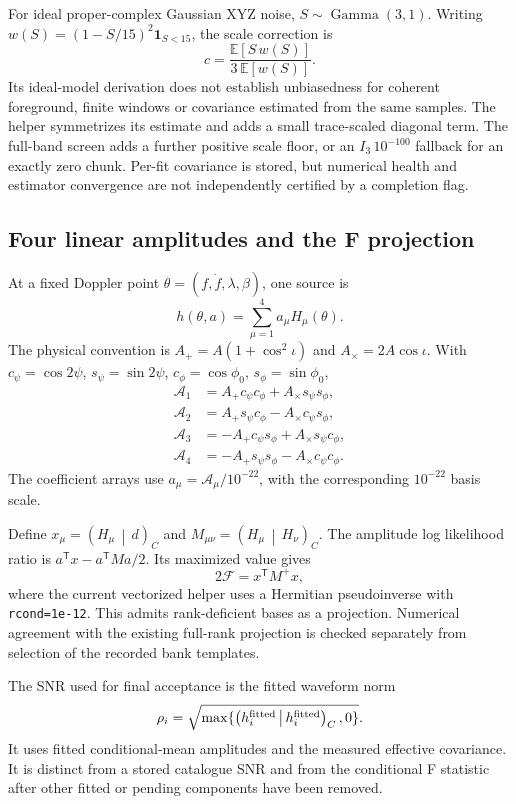 \documentclass[11pt,a4paper]{article}
\newcommand{\code}[1]{\texttt{\nolinkurl{#1}}}
\newcommand{\ip}[2]{\left(#1\,\middle|\,#2\right)}
\begin{document}
For ideal proper-complex Gaussian XYZ noise, \(S\sim\operatorname{Gamma}(3,1)\).
Writing \(w(S)=(1-S/15)^2\mathbf1_{S<15}\), the scale correction is
\[
c=\frac{\mathbb E[S\,w(S)]}{3\,\mathbb E[w(S)]}.
\]
Its ideal-model derivation does not establish unbiasedness for coherent
foreground, finite windows or covariance estimated from the same samples.
The helper symmetrizes its estimate and adds a small trace-scaled diagonal
term. The full-band screen adds a further positive scale floor, or an
\(I_3\,10^{-100}\) fallback for an exactly zero chunk. Per-fit covariance is
stored, but numerical health and estimator convergence are not independently
certified by a completion flag.

\subsection{Four linear amplitudes and the F projection}

At a fixed Doppler point \(\theta=(f,\dot f,\lambda,\beta)\), one source is
\[
h(\theta,a)=\sum_{\mu=1}^4 a_\mu H_\mu(\theta).
\]
The physical convention is \(A_+=A(1+\cos^2\iota)\) and
\(A_\times=2A\cos\iota\). With \(c_\psi=\cos2\psi\),
\(s_\psi=\sin2\psi\), \(c_\phi=\cos\phi_0\), \(s_\phi=\sin\phi_0\),
\begin{align}
\mathcal A_1&=A_+c_\psi c_\phi+A_\times s_\psi s_\phi,\\
\mathcal A_2&=A_+s_\psi c_\phi-A_\times c_\psi s_\phi,\\
\mathcal A_3&=-A_+c_\psi s_\phi+A_\times s_\psi c_\phi,\\
\mathcal A_4&=-A_+s_\psi s_\phi-A_\times c_\psi c_\phi.
\end{align}
The coefficient arrays use \(a_\mu=\mathcal A_\mu/10^{-22}\), with the
corresponding \(10^{-22}\) basis scale.

Define \(x_\mu=\ip{H_\mu}{d}_C\) and
\(M_{\mu\nu}=\ip{H_\mu}{H_\nu}_C\). The amplitude log likelihood ratio is
\(a^\mathsf T x-a^\mathsf T M a/2\). Its maximized value gives
\[
2\mathcal F=x^\mathsf T M^+x,
\]
where the current vectorized helper uses a Hermitian pseudoinverse with
\code{rcond=1e-12}. This admits rank-deficient bases as a projection. Numerical
agreement with the existing full-rank projection is checked separately from
selection of the recorded bank templates.

The SNR used for final acceptance is the fitted waveform norm
\[
\rho_i=\sqrt{\max\{\ip{h_i^{\rm fitted}}{h_i^{\rm fitted}}_C,0\}}.
\]
It uses fitted conditional-mean amplitudes and the measured effective
covariance. It is distinct from a stored catalogue SNR and from the conditional
F statistic after other fitted or pending components have been removed.
\end{document}

